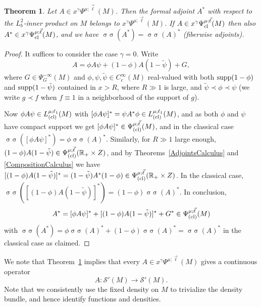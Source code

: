 \documentclass[reqno]{amsart}
\numberwithin{equation}{section}
\newtheorem{theorem}[equation]{Theorem}
\theoremstyle{definition}
\def\R{\mathbb R}
\def\S{\mathscr S}
\DeclareMathOperator{\sym}{ \sigma\!\!\!\sigma}
\begin{document}
\begin{theorem}\label{AdjointsM}
Let $A \in x^{\gamma} \Psi^{\mu;\vec{\ell}}(M)$. Then the formal adjoint $A^*$ with respect to the $L^2_b$-inner product on $M$ belongs to $x^{\gamma} \Psi^{\mu;\vec{\ell}}(M)$. If $A \in x^{\gamma} \Psi^{\mu;\vec{\ell}}_{\textup{cl}}(M)$ then also $A^* \in x^{\gamma} \Psi^{\mu;\vec{\ell}}_{\textup{cl}}(M)$, and we have $\sym(A^*) = \sym(A)^*$ (fiberwise adjoints).
\end{theorem}
\begin{proof}
It suffices to consider the case $\gamma = 0$. Write
$$
A = \phi A \psi + (1-\phi) A (1-\tilde{\psi}) + G,
$$
where $G \in \Psi^{-\infty}_G(M)$ and $\phi,\psi,\tilde{\psi} \in C_c^{\infty}(M)$ real-valued with both $\textup{supp}(1-\phi)$ and $\textup{supp}(1-\tilde{\psi})$ contained in $x > R$, where $R \gg 1$ is large, and $\tilde{\psi} \prec \phi \prec \psi$ (we write $g \prec f$ when $f \equiv 1$ in a neighborhood of the support of $g$).

Now $\phi A \psi \in L_{\textup{(cl)}}^{\mu;\ell_1}(M)$ with $[\phi A \psi]^* = \psi A^* \phi \in L_{\textup{(cl)}}^{\mu;\ell_1}(M)$, and as both $\phi$ and $\psi$ have compact support we get $[\phi A \psi]^* \in \Psi^{\mu;\vec{\ell}}_{\textup{(cl)}}(M)$, and in the classical case $\sym([\phi A \psi]^*) = \phi \sym(A)^*$. Similarly, for $R \gg 1$ large enough, $(1-\phi) A (1-\tilde{\psi}) \in \Psi^{\mu;\vec{\ell}}_{\textup{(cl)}}(\R_+\times Z)$, and by Theorems~\ref{AdjointsCalculus} and \ref{CompositionCalculus} we have $[(1-\phi) A (1-\tilde{\psi})]^* = (1 - \tilde{\psi}) A^* (1-\phi) \in \Psi^{\mu;\vec{\ell}}_{\textup{(cl)}}(\R_+\times Z)$. In the classical case, $\sym([(1-\phi) A (1-\tilde{\psi})]^*) = (1-\phi)\sym(A)^*$. In conclusion,
$$
A^* =  [\phi A \psi]^* + [(1-\phi) A (1-\tilde{\psi})]^* + G^* \in \Psi^{\mu;\vec{\ell}}_{\textup{(cl)}}(M)
$$
with $\sym(A^*) = \phi \sym(A)^* + (1-\phi) \sym(A)^* = \sym(A)^*$ in the classical case as claimed.
\end{proof}

\noindent
We note that Theorem~\ref{AdjointsM} implies that every $A \in x^{\gamma}\Psi^{\mu;\vec{\ell}}(M)$ gives a continuous operator
$$
A : \S'(M) \to \S'(M).
$$
Note that we consistently use the fixed density on $M$ to trivialize the density bundle, and hence identify functions and densities.
\end{document}
